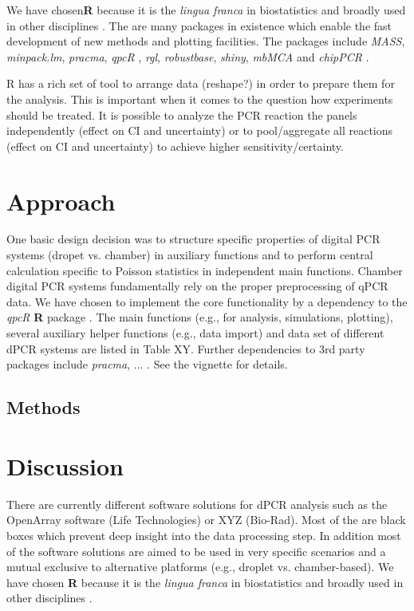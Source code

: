 \documentclass{bioinfo}
\begin{document}
We have chosen\textbf{R} because it is the \textit{lingua franca} in biostatistics and broadly 
used in other disciplines \cite{rodiger_r_2015}. The are many packages in existence which enable the 
fast development of new methods and plotting facilities. The packages include 
\textit{MASS}, \textit{minpack.lm}, \textit{pracma}, \textit{qpcR} \cite{ritz_qpcr_2008}, \textit{rgl}, \textit{robustbase}, \textit{shiny}, \textit{mbMCA} \cite{rodiger_surface_2013} and \textit{chipPCR} \cite{rodiger_chippcr_2015}.

R has a rich set of tool to arrange data (reshape?) in order to prepare them for 
the analysis. This is important when it comes to the question how experiments 
should be treated. It is possible to analyze the PCR reaction the panels 
independently (effect on CI and uncertainty) or to pool/aggregate all reactions 
(effect on CI and uncertainty) to achieve higher sensitivity/certainty.

\section{Approach}
One basic design decision was to structure specific properties of digital PCR 
systems (dropet vs. chamber) in auxiliary functions and to perform central 
calculation specific to Poisson statistics in independent main functions. 
Chamber digital PCR systems fundamentally rely on the proper preprocessing of 
qPCR data. We have chosen to implement the core functionality by a dependency to 
the \textit{qpcR} \textbf{R} package \cite{ritz_qpcr_2008}. The main functions (e.g., for analysis, 
simulations, plotting), several auxiliary helper functions (e.g., data import) 
and data set of different dPCR systems are listed in Table XY. Further 
dependencies to 3rd party packages include \textit{pracma}, ... . See the vignette for 
details.
\begin{methods}
\section{Methods}



\end{methods}


\section{Discussion}

There are currently different software solutions for dPCR analysis such as the 
OpenArray software (Life Technologies) or XYZ (Bio-Rad). Most of the are black 
boxes which prevent deep insight into the data processing step. In addition most 
of the software solutions are aimed to be used in very specific scenarios and a 
mutual exclusive to alternative platforms (e.g., droplet vs. chamber-based). We 
have chosen \textbf{R} because it is the \textit{lingua franca} in biostatistics and broadly used 
in other disciplines \cite{rodiger_r_2015}.
\end{document}
